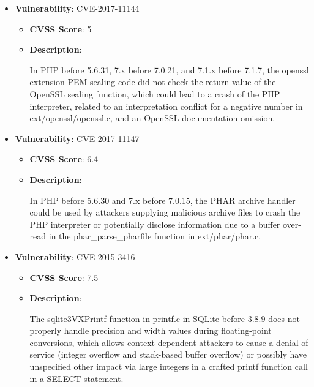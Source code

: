 \documentclass{article}
\begin{document}
\begin{itemize}
        \item \textbf{Vulnerability}: CVE-2017-11144
        \begin{itemize}
            \item \textbf{CVSS Score}:  5 
            \item \textbf{Description}:
            \parbox[t]{0.9\linewidth}{
                \ttfamily In PHP before 5.6.31, 7.x before 7.0.21, and 7.1.x before 7.1.7, the openssl extension PEM sealing code did not check the return value of the OpenSSL sealing function, which could lead to a crash of the PHP interpreter, related to an interpretation conflict for a negative number in ext/openssl/openssl.c, and an OpenSSL documentation omission.
            }
        \end{itemize}
    
        \item \textbf{Vulnerability}: CVE-2017-11147
        \begin{itemize}
            \item \textbf{CVSS Score}:  6.4 
            \item \textbf{Description}:
            \parbox[t]{0.9\linewidth}{
                \ttfamily In PHP before 5.6.30 and 7.x before 7.0.15, the PHAR archive handler could be used by attackers supplying malicious archive files to crash the PHP interpreter or potentially disclose information due to a buffer over-read in the phar\_parse\_pharfile function in ext/phar/phar.c.
            }
        \end{itemize}
    
        \item \textbf{Vulnerability}: CVE-2015-3416
        \begin{itemize}
            \item \textbf{CVSS Score}:  7.5 
            \item \textbf{Description}:
            \parbox[t]{0.9\linewidth}{
                \ttfamily The sqlite3VXPrintf function in printf.c in SQLite before 3.8.9 does not properly handle precision and width values during floating-point conversions, which allows context-dependent attackers to cause a denial of service (integer overflow and stack-based buffer overflow) or possibly have unspecified other impact via large integers in a crafted printf function call in a SELECT statement.
            }
        \end{itemize}
    

\end{itemize}
\end{document}
